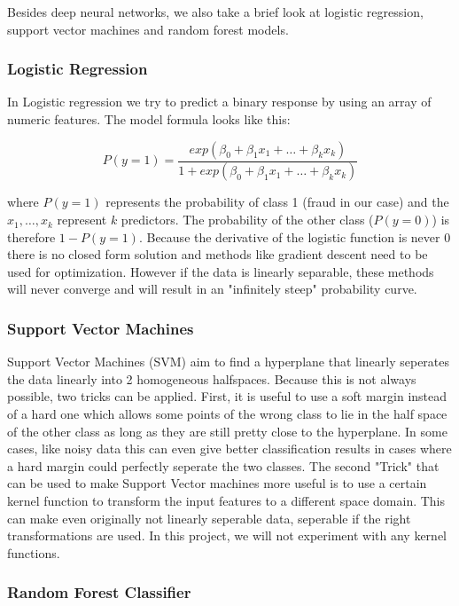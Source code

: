 \documentclass[utf8x]{ctexart}
\begin{document}
Besides deep neural networks, we also take a brief look at logistic regression, support vector machines and random forest models.

\subsubsection{Logistic Regression}
In Logistic regression we try to predict a binary response by using an array of numeric features. The model formula looks like this:

\[ P(y=1) =  \frac{exp(\beta_0 + \beta_1x_1 + \dots + \beta_kx_k)}{1 + exp(\beta_0 + \beta_1x_1 + \dots + \beta_kx_k)}\]

where $P(y=1)$ represents the probability of class 1 (fraud in our case) and the $x_1, \dots, x_k$ represent $k$ predictors. The probability of the other class ($P(y=0)$) is therefore $1-P(y=1)$.
Because the derivative of the logistic function is never 0 there is no closed form solution and methods like gradient descent need to be used for optimization. However if the data is linearly separable, these methods will never converge and will result in an "infinitely steep" probability curve.

\subsubsection{Support Vector Machines}

Support Vector Machines (SVM) aim to find a hyperplane that linearly seperates the data linearly into 2 homogeneous halfspaces. Because this is not always possible, two tricks can be applied. First, it is useful to use a soft margin instead of a hard one which allows some points of the wrong class to lie in the half space of the other class as long as they are still pretty close to the hyperplane. In some cases, like noisy data this can even give better classification results in cases where a hard margin could perfectly seperate the two classes. The second "Trick" that can be used to make Support Vector machines more useful is to use a certain kernel function to transform the input features to a different space domain. This can make even originally not linearly seperable data, seperable if the right transformations are used. In this project, we will not experiment with any kernel functions.

\subsubsection{Random Forest Classifier}
\end{document}
